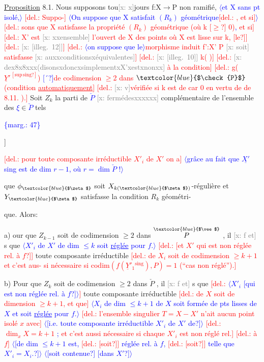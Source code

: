 \documentclass[11pt]{article}
\newcommand{\scanpage}[1]{\par\bigskip\noindent{\small\sffamily[scan #1]}\par}
\newcommand{\mspage}[1]{{\small\sffamily[p.\,#1]}}
\newcommand{\hand}[1]{\textcolor{blue}{#1}}
\let\over\relax
\newcommand{\over}[2]{\textcolor{gray}{#1}\textcolor{blue}{\ensuremath{^{\!\nearrow}}#2}}
\newcommand{\inserted}[2][]{\textcolor{blue}{$\langle$#2$\rangle$}}
\newcommand{\margin}[1]{\textcolor{blue}{\{\textsf{marg.:} #1\}}}
\newcommand{\deleted}[1]{\textcolor{red}{[\textsf{del.:} #1]}}
\newcommand{\xout}[1]{\textcolor{gray}{[\textsf{x:} #1]}}
\newcommand{\uline}[1]{\underline{#1}}
\newcommand{\unsure}[1]{[#1?]}
\newcommand{\illegible}[1]{[\textsf{illeg.\ #1}]}
\begin{document}
\uline{Proposition} 8.1\over{2}{3}.   Nous supposons tou\xout{x}jours f:X$\to$P non ramifié, \inserted{et X sans pt isolé,} \deleted{Suppo-}
\inserted{On suppose que X satisfait $(R_k)$ géométrique\deleted{, et si}}
\deleted{sons que X satisfasse la propriété $(R_k)$ géométrique  (où k \unsure{$\geq$} 0)\hand{,} et si}
\deleted{X' est \xout{xxensemble} l'ouvert de X des points où X est lisse sur k, \unsure{le}}
\deleted{\xout{\illegible{12}}}
\deleted{\inserted{on suppose que le}morphisme  induit f':X'  P  \xout{soit} satisfasse \xout{auxxconditionsxéquivalentes}}
\deleted{\xout{\illegible{10}} k(  )}
\deleted{\xout{dex8x8xxx(disonsxdoncxsimplementxX'xestxnonxx}  à la condition}
\deleted{g( $\underline{Y}'^{\,\mathrm{\unsure{sup\,sing}}}$) \hand{\unsure{´}}de codimension $\geq$2 dans $\hand{$\check{P}$}$ (condition \uline{automatiquement}}
\deleted{\xout{v}vérifiée si k est de car 0 en vertu de de 8.11. ).}  Soit $Z_k$ la parti
de \hand{$\check{P}$} \xout{fermédesxxxxxx} complémentaire de l'ensemble des \hand{$\xi$}$\in$\hand{$\check{P}$}  tels

\margin{47}

\clearpage
\scanpage{25/48}
\mspage{\unsure{45|46}}

\deleted{pour toute composante irréductible $X'_i$ de $X'$ on a}
\inserted{grâce au fait que $\underline{X'}$ sing est de dim $r-1$, où $r=\dim \check{P}$ !}

que $\phi_{\hand{$\zeta$}}$ soit $X_{k(\hand{$\zeta$})}$-régulière et $Y_{\hand{$\zeta$}}$ satisfasse la condition $R_k$ géométri-%

que. Alors:

a) \over{B}{P}our que $Z_{k-1}$ soit de codimension $\geq 2$ dans $\overset{\hand{$\vee$}}{P}$ , il \xout{f et} s que
\inserted{$X'_i$ de $X'$ de dim $\leq k$ soit \uline{réglée} pour $f$.} \deleted{\unsure{et $X'$ qui est non réglée rel. à $f$}}
toute composante irréductible \deleted{de $X_i$ soit de codimension $\geq k+1$ et c'est aus-%
si nécessaire si codim$(f(\underline{Y}'_1{}^{\mathrm{sing}}),P) = 1$ (``cas non réglé'').}

b) Pour que $Z_k$ soit de codimension $\geq 2$ dans $\check{P}$ , il \xout{f et} s que
\deleted{\inserted{$X'_i$ \unsure{qui est non réglée rel. à $f$}}}
toute composante irréductible \deleted{de $X$ soit de dimension $\geq k+1$, et que}
\inserted{$X_i$ de dim $\leq k+1$ de $X$ soit formée de pts lisses de $X$ et soit \uline{réglée} pour $f$.}
\deleted{l'ensemble singulier $T = X-X'$ n'ait aucun point isolé $x$ avec}
\inserted{\unsure{i.e. toute composante irréductible $X'_i$ de $X'$ de}}
\deleted{$\dim_x X = k+1$ \hand{;} et c'est aussi nécessaire si chaque $X'_i$ est non réglé rel.}
\deleted{à $f$} \inserted{\unsure{de dim $\leq k+1$ est, \deleted{\unsure{soit}} réglée rel. à $f$, \deleted{\unsure{soit}} telle que $X'_i = X_i$.}}
\inserted{\unsure{soit contenue} \unsure{dans $X'$}}
\end{document}
